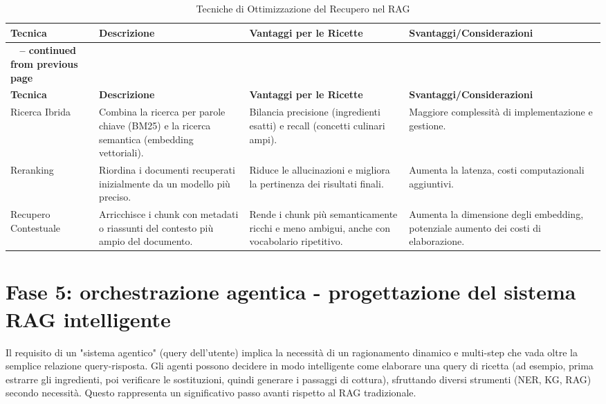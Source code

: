 \documentclass[a4paper, 11pt]{article}
\begin{document}
\begin{longtable}{>{\raggedright\arraybackslash}p{3cm} >{\raggedright\arraybackslash}p{4.5cm} >{\raggedright\arraybackslash}p{4.5cm} >{\raggedright\arraybackslash}p{4.5cm}}
\caption{Tecniche di Ottimizzazione del Recupero nel RAG}\\
\toprule
\textbf{Tecnica} & \textbf{Descrizione} & \textbf{Vantaggi per le Ricette} & \textbf{Svantaggi/Considerazioni} \\
\midrule
\endfirsthead
\multicolumn{4}{c}%
{{\bfseries \tablename\ \thetable{} -- continued from previous page}} \\
\toprule
\textbf{Tecnica} & \textbf{Descrizione} & \textbf{Vantaggi per le Ricette} & \textbf{Svantaggi/Considerazioni} \\
\midrule
\endhead
\bottomrule
\endfoot
Ricerca Ibrida \cite{hybrid_search_vectorchord} & Combina la ricerca per parole chiave (BM25) e la ricerca semantica (embedding vettoriali). & Bilancia precisione (ingredienti esatti) e recall (concetti culinari ampi). \cite{hybrid_search_vectorchord} & Maggiore complessità di implementazione e gestione. \cite{hybrid_search_vectorchord} \\
\addlinespace
Reranking \cite{mastering_rag_reranking} & Riordina i documenti recuperati inizialmente da un modello più preciso. & Riduce le allucinazioni e migliora la pertinenza dei risultati finali. \cite{mastering_rag_reranking} & Aumenta la latenza, costi computazionali aggiuntivi. \cite{reranking_mechanisms_medium} \\
\addlinespace
Recupero Contestuale \cite{contextual_retrieval_pluralsight} & Arricchisce i chunk con metadati o riassunti del contesto più ampio del documento. & Rende i chunk più semanticamente ricchi e meno ambigui, anche con vocabolario ripetitivo. \cite{contextual_retrieval_mlexpert} & Aumenta la dimensione degli embedding, potenziale aumento dei costi di elaborazione. \cite{contextual_retrieval_somawansa} \\
\end{longtable}

\section{Fase 5: orchestrazione agentica - progettazione del sistema RAG intelligente}
Il requisito di un "sistema agentico" (query dell'utente) implica la necessità di un ragionamento dinamico e multi-step che vada oltre la semplice relazione query-risposta. Gli agenti possono decidere in modo intelligente come elaborare una query di ricetta (ad esempio, prima estrarre gli ingredienti, poi verificare le sostituzioni, quindi generare i passaggi di cottura), sfruttando diversi strumenti (NER, KG, RAG) secondo necessità. Questo rappresenta un significativo passo avanti rispetto al RAG tradizionale.
\end{document}
